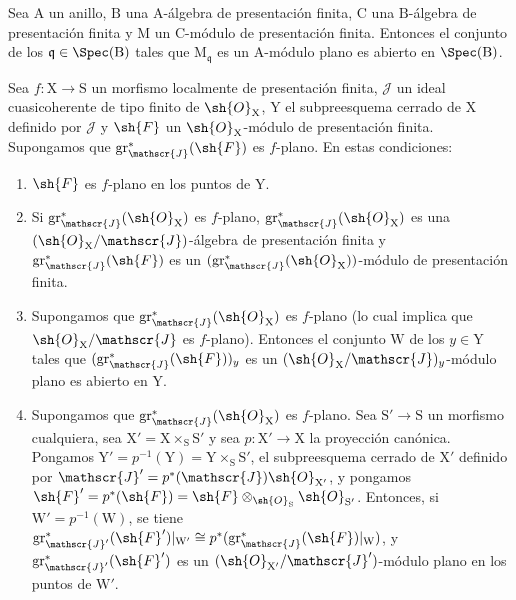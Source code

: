 \begin{corollary}[11.3.3]
\label{IV.11.3.3}
Sea $\mathrm{A}$ un anillo, $\mathrm{B}$ una $\mathrm{A}$-álgebra de presentación finita, $\mathrm{C}$ una $\mathrm{B}$-álgebra de presentación finita y $\mathrm{M}$ un $\mathrm{C}$-módulo de presentación finita. Entonces el conjunto de los $\mathfrak{q}\in\Spec(\mathrm{B})$ tales que $\mathrm{M}_\mathfrak{q}$ es un $\mathrm{A}$-módulo plano es abierto en $\Spec(\mathrm{B})$.
\end{corollary}

\begin{proposition}[11.3.4]
\label{IV.11.3.4}
Sea $f:\mathrm{X}\to\mathrm{S}$ un morfismo localmente de presentación finita, $\mathscr{J}$ un ideal cuasicoherente de tipo finito de $\sh{O}_\mathrm{X}$, $\mathrm{Y}$ el subpreesquema cerrado de $\mathrm{X}$ definido por $\mathscr{J}$ y $\sh{F}$ un $\sh{O}_\mathrm{X}$-módulo de presentación finita. Supongamos que $\operatorname{gr}^*_\mathscr{J}(\sh{F})$ es $f$-plano. En estas condiciones:
\begin{enumerate}[label=\emph{(\roman*)}]
  \item $\sh{F}$ es $f$-plano en los puntos de $\mathrm{Y}$.
  \item Si $\operatorname{gr}^*_\mathscr{J}(\sh{O}_\mathrm{X})$ es $f$-plano, $\operatorname{gr}^*_\mathscr{J}(\sh{O}_\mathrm{X})$ es una $(\sh{O}_\mathrm{X}/\mathscr{J})$-álgebra de presentación finita y $\operatorname{gr}^*_\mathscr{J}(\sh{F})$ es un $(\operatorname{gr}^*_\mathscr{J}(\sh{O}_\mathrm{X}))$-módulo de presentación finita.
  \item Supongamos que $\operatorname{gr}^*_\mathscr{J}(\sh{O}_\mathrm{X})$ es $f$-plano (lo cual implica que $\sh{O}_\mathrm{X}/\mathscr{J}$ es $f$-plano). Entonces el conjunto $\mathrm{W}$ de los $y\in\mathrm{Y}$ tales que $(\operatorname{gr}^*_\mathscr{J}(\sh{F}))_y$ es un $(\sh{O}_\mathrm{X}/\mathscr{J})_y$-módulo plano es abierto en $\mathrm{Y}$.
  \item Supongamos que $\operatorname{gr}^*_\mathscr{J}(\sh{O}_\mathrm{X})$ es $f$-plano. Sea $\mathrm{S}'\to\mathrm{S}$ un morfismo cualquiera, sea $\mathrm{X}'=\mathrm{X}\times_\mathrm{S}\mathrm{S}'$ y sea $p:\mathrm{X}'\to\mathrm{X}$ la proyección canónica. Pongamos $\mathrm{Y}'=p^{-1}(\mathrm{Y})=\mathrm{Y}\times_\mathrm{S}\mathrm{S}'$, el subpreesquema cerrado de $\mathrm{X}'$ definido por $\mathscr{J}'=p^*(\mathscr{J})\sh{O}_{\mathrm{X}'}$, y pongamos $\sh{F}'=p^*(\sh{F})=\sh{F}\otimes_{\sh{O}_\mathrm{S}}\sh{O}_{\mathrm{S}'}$. Entonces, si $\mathrm{W}'=p^{-1}(\mathrm{W})$, se tiene $\operatorname{gr}^*_{\mathscr{J}'}(\sh{F}')|_{\mathrm{W}'}\cong p^*(\operatorname{gr}^*_\mathscr{J}(\sh{F})|_\mathrm{W})$, y $\operatorname{gr}^*_{\mathscr{J}'}(\sh{F}')$ es un $(\sh{O}_{\mathrm{X}'}/\mathscr{J}')$-módulo plano en los puntos de $\mathrm{W}'$.
\end{enumerate}
\end{proposition}

